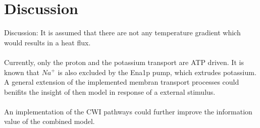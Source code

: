 \section{Discussion}
Discussion: It is assumed that there are not any temperature gradient which would results in a heat flux.\\\\
Currently, only the proton and the potassium transport are ATP driven. It is known that $Na^+$ is also excluded by the Ena1p pump, which extrudes potassium. A general extension of the implemented membran transport processes could benifits the insight of then model in response of a external stimulus.\\\\
An implementation of the CWI pathways could further improve the information value of the combined model.